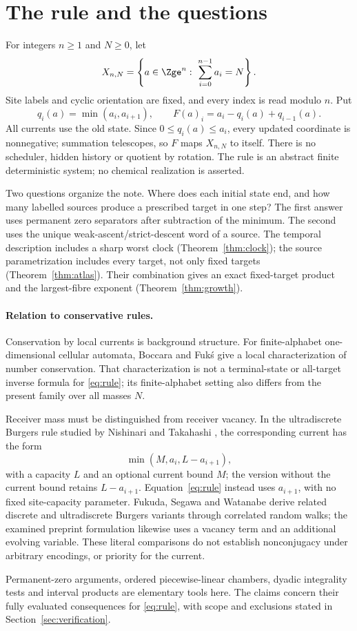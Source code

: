 \section{The rule and the questions}\label{sec:rule}
For integers $n\ge1$ and $N\ge0$, let
\[
 X_{n,N}=\left\{a\in\Zge^n:\ \sum_{i=0}^{n-1}a_i=N\right\}.
\]
Site labels and cyclic orientation are fixed, and every index is read
modulo $n$. Put
\begin{equation}\label{eq:rule}
 q_i(a)=\min(a_i,a_{i+1}),\qquad
 F(a)_i=a_i-q_i(a)+q_{i-1}(a).
\end{equation}
All currents use the old state. Since $0\le q_i(a)\le a_i$, every updated
coordinate is nonnegative; summation telescopes, so $F$ maps $X_{n,N}$
to itself. There is no scheduler, hidden history or quotient by rotation.
The rule is an abstract finite deterministic system; no chemical
realization is asserted.

Two questions organize the note. Where does each initial state end, and
how many labelled sources produce a prescribed target in one step?
The first answer uses permanent zero separators after subtraction of the
minimum. The second uses the unique weak-ascent/strict-descent word of a
source. The temporal description includes a sharp worst clock
(Theorem~\ref{thm:clock}); the source parametrization includes every target,
not only fixed targets (Theorem~\ref{thm:atlas}). Their combination gives
an exact fixed-target product and the largest-fibre exponent
(Theorem~\ref{thm:growth}).

\paragraph{Relation to conservative rules.}
Conservation by local currents is background structure. For finite-alphabet
one-dimensional cellular automata, Boccara and Fuk\'s
\cite{boccara2002} give a local characterization of number conservation.
That characterization is not a terminal-state or all-target inverse
formula for \eqref{eq:rule}; its finite-alphabet setting also differs from
the present family over all masses $N$.

Receiver mass must be distinguished from receiver vacancy. In the
ultradiscrete Burgers rule studied by Nishinari and Takahashi
\cite{nishinari1998}, the corresponding current has the form
\[
 \min(M,a_i,L-a_{i+1}),
\]
with a capacity $L$ and an optional current bound $M$; the version without
the current bound retains $L-a_{i+1}$. Equation~\eqref{eq:rule} instead
uses $a_{i+1}$, with no fixed site-capacity parameter.
Fukuda, Segawa and Watanabe \cite{fukuda2023} derive related discrete and
ultradiscrete Burgers variants through correlated random walks; the
examined preprint formulation likewise uses a vacancy term and an
additional evolving variable. These literal comparisons do not establish
nonconjugacy under arbitrary encodings, or priority for the current.

Permanent-zero arguments, ordered piecewise-linear chambers, dyadic
integrality tests and interval products are elementary tools here.
The claims concern their fully evaluated consequences for
\eqref{eq:rule}, with scope and exclusions stated in
Section~\ref{sec:verification}.

